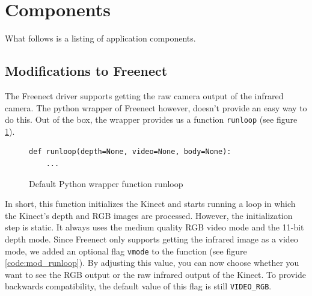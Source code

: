 

\section{Components}

What follows is a listing of application components.

\subsection{Modifications to Freenect}
\label{sec:mod_to_freenect}

The Freenect driver supports getting the raw camera output of the infrared camera. The python wrapper of Freenect however, doesn't provide an easy way to do this. Out of the box, the wrapper provides us a function \verb|runloop| (see figure \ref{code:def_runloop}).

\begin{figure}[H]
\begin{lstlisting}
def runloop(depth=None, video=None, body=None):
    ...
\end{lstlisting}
\caption{Default Python wrapper function runloop}
\label{code:def_runloop}
\end{figure}

In short, this function initializes the Kinect and starts running a loop in which the Kinect's depth and RGB images are processed. However, the initialization step is static. It always uses the medium quality RGB video mode and the 11-bit depth mode. Since Freenect only supports getting the infrared image as a video mode, we added an optional flag \verb|vmode| to the function (see figure \ref{code:mod_runloop}). By adjusting this value, you can now choose whether you want to see the RGB output or the raw infrared output of the Kinect. To provide backwards compatibility, the default value of this flag is still \verb|VIDEO_RGB|.

